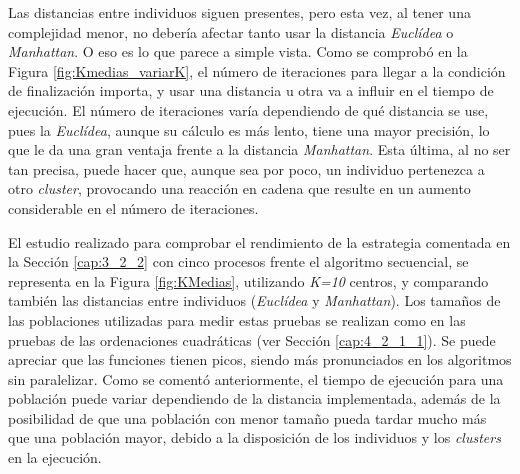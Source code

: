 
Las distancias entre individuos siguen presentes, pero esta vez, al tener una complejidad menor, no debería afectar tanto usar la distancia \textit{Euclídea} o \textit{Manhattan}. O eso es lo que parece a simple vista. Como se comprobó en la Figura \ref{fig:Kmedias_variarK}, el número de iteraciones para llegar a la condición de finalización importa, y usar una distancia u otra va a influir en el tiempo de ejecución. El número de iteraciones varía dependiendo de qué distancia se use, pues la \textit{Euclídea}, aunque su cálculo es más lento, tiene una mayor precisión, lo que le da una gran ventaja frente a la distancia \textit{Manhattan}. Esta última, al no ser tan precisa, puede hacer que, aunque sea por poco, un individuo pertenezca a otro \textit{cluster}, provocando una reacción en cadena que resulte en un aumento considerable en el número de iteraciones. 

El estudio realizado para comprobar el rendimiento de la estrategia comentada en la Sección \ref{cap:3_2_2} con cinco procesos frente el algoritmo secuencial, se representa en la Figura \ref{fig:KMedias}, utilizando \textit{K=10} centros, y comparando también las distancias entre individuos (\textit{Euclídea} y \textit{Manhattan}). Los tamaños de las poblaciones utilizadas para medir estas pruebas se realizan como en las pruebas de las ordenaciones cuadráticas (ver Sección \ref{cap:4_2_1_1}). Se puede apreciar que las funciones tienen picos, siendo más pronunciados en los algoritmos sin paralelizar. Como se comentó anteriormente, el tiempo de ejecución para una población puede variar dependiendo de la distancia implementada, además de la posibilidad de que una población con menor tamaño pueda tardar mucho más que una población mayor, debido a la disposición de los individuos y los \textit{clusters} en la ejecución. 						


